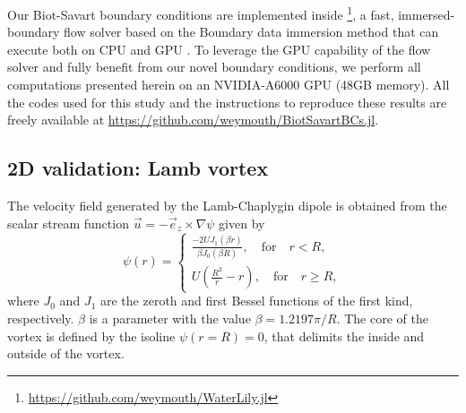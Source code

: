 \documentclass[preprint,12pt]{elsarticle}
\begin{document}
Our Biot-Savart boundary conditions are implemented inside \textbf{}\footnote{\url{https://github.com/weymouth/WaterLily.jl}}, a fast, immersed-boundary flow solver based on the Boundary data immersion method \cite{Maertens2015} that can execute both on CPU and GPU \cite{Weymouth2023WaterLily.jl:Execution}. To leverage the GPU capability of the flow solver and fully benefit from our novel boundary conditions, we perform all computations presented herein on an NVIDIA-A6000 GPU (48GB memory). All the codes used for this study and the instructions to reproduce these results are freely available at \url{https://github.com/weymouth/BiotSavartBCs.jl}.

\subsection{2D validation: Lamb vortex}

The velocity field generated by the Lamb-Chaplygin dipole is obtained from the scalar stream function $\vec{u} = -\vec{e}_z\times \nabla \psi$ given by
\begin{equation}
    \psi(r) = \begin{cases}
    \frac{-2UJ_1(\beta r)}{\beta J_0(\beta R)}, \quad \text{for} \quad r < R,\\
    U\left(\frac{R^2}{r}-r\right), \quad \text{for} \quad r \ge R,    \end{cases}
\end{equation}
where $J_0$ and $J_1$ are the zeroth and first Bessel functions of the first kind, respectively. $\beta$ is a parameter with the value $\beta=1.2197\pi/R$. The core of the vortex is defined by the isoline $\psi(r=R)=0$, that delimits the inside and outside of the vortex.
\end{document}
